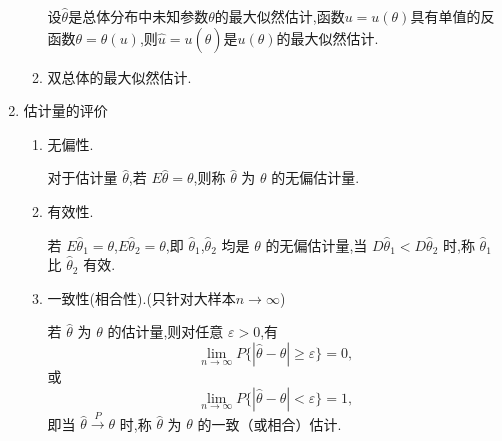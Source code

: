 \begin{enumerate}
\begin{enumerate}
                        设$\hat{\theta}$是总体分布中未知参数$\theta$的最大似然估计,函数$u=u(\theta)$具有单值的反函数$\theta=\theta(u)$,则$\hat{u}=u(\hat{\theta})$是$u(\theta)$的最大似然估计.
                  \item 双总体的最大似然估计.
            \end{enumerate}
      \item 估计量的评价
            \begin{enumerate}
                  \item 无偏性.

                        对于估计量 $\hat{\theta}$,若 $E\hat{\theta}=\theta$,则称 $\hat{\theta}$ 为 $\theta$ 的无偏估计量.
                  \item 有效性.

                        若 $E\hat{\theta}_{1}=\theta$,$E\hat{\theta}_{2}=\theta$,即 $\hat{\theta}_{1}$,$\hat{\theta}_{2}$ 均是 $\theta$ 的无偏估计量,当 $D\hat{\theta}_{1}<D\hat{\theta}_{2}$ 时,称 $\hat{\theta}_{1}$ 比 $\hat{\theta}_{2}$ 有效.
                  \item 一致性(相合性).(只针对大样本$n\rightarrow\infty$)

                        若 $\hat{\theta}$ 为 $\theta$ 的估计量,则对任意 $\varepsilon>0$,有
                        $$\lim_{n\rightarrow\infty}P\{\left|\hat{\theta}-\theta\right|\geqslant\varepsilon\}=0,$$
                        或
                        $$
                              \lim_{n\rightarrow\infty}P\{\left|\hat{\theta}-\theta\right|<\varepsilon\}=1,$$
                        即当 $\hat{\theta}\stackrel{P}{\longrightarrow}\theta$ 时,称 $\hat{\theta}$ 为 $\theta$ 的一致（或相合）估计.
            \end{enumerate}
\end{enumerate}

